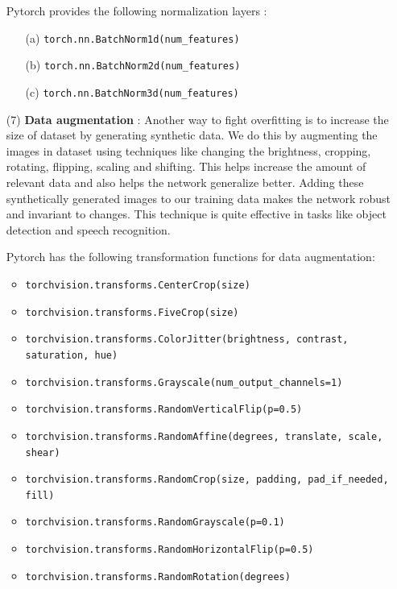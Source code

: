 \begin{itemize}
    Pytorch provides the following normalization layers :
    \begin{itemize}
        \item[(a)] \texttt{torch.nn.BatchNorm1d(num\_features)}
        \item[(b)] \texttt{torch.nn.BatchNorm2d(num\_features)}
        \item[(c)] \texttt{torch.nn.BatchNorm3d(num\_features)}
    \end{itemize}
    \item[(7)] \textbf{Data augmentation} : Another way to fight overfitting is to increase the size of dataset by generating synthetic data. 
    We do this by augmenting the images in dataset using techniques like changing the brightness, cropping, rotating, flipping, scaling and shifting. 
    This helps increase the amount of relevant data and also helps the network generalize better. 
    Adding these synthetically generated images to our training data makes the network robust and invariant to changes. This technique is quite effective in tasks like object detection and speech recognition.
    
    Pytorch has the following transformation functions for data augmentation:
    \begin{itemize}
        \item \texttt{torchvision.transforms.CenterCrop(size)}
        \item \texttt{torchvision.transforms.FiveCrop(size)}
        \item \texttt{torchvision.transforms.ColorJitter(brightness, contrast, saturation, hue)}
        \item \texttt{torchvision.transforms.Grayscale(num\_output\_channels=1)}
        \item \texttt{torchvision.transforms.RandomVerticalFlip(p=0.5)}
        \item \texttt{torchvision.transforms.RandomAffine(degrees, translate, scale, shear)}
        \item \texttt{torchvision.transforms.RandomCrop(size, padding, pad\_if\_needed, fill)}
        \item \texttt{torchvision.transforms.RandomGrayscale(p=0.1)}
        \item \texttt{torchvision.transforms.RandomHorizontalFlip(p=0.5)}
        \item \texttt{torchvision.transforms.RandomRotation(degrees)}
    \end{itemize}


\end{itemize}
